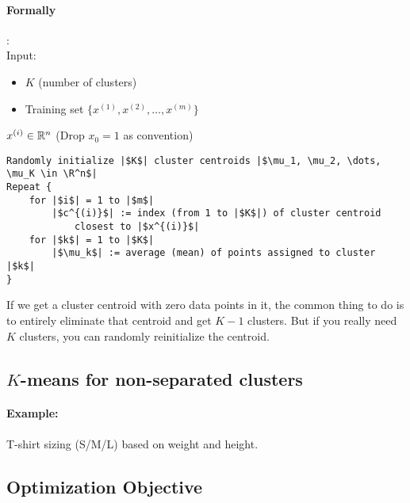 \paragraph{Formally}:\\
Input:
\begin{itemize}
	\item $K$ (number of clusters)
	\item Training set $\{x^{(1)}, x^{(2)}, \dots, x^{(m)}\}$
\end{itemize}

\begin{remark}
	$x^{(i)} \in \mathbb{R}^n$ (Drop $x_0 = 1$ as convention)
\end{remark}

\begin{verbatim}
Randomly initialize |$K$| cluster centroids |$\mu_1, \mu_2, \dots, \mu_K \in \R^n$|
Repeat {
	for |$i$| = 1 to |$m$|
		|$c^{(i)}$| := index (from 1 to |$K$|) of cluster centroid
			closest to |$x^{(i)}$|
	for |$k$| = 1 to |$K$|
		|$\mu_k$| := average (mean) of points assigned to cluster |$k$|
}
\end{verbatim}

\begin{remark}
	If we get a cluster centroid with zero data points in it, the common thing to do is to
	entirely eliminate that centroid and get $K-1$ clusters. But if you really need $K$
	clusters, you can randomly reinitialize the centroid.
\end{remark}

\subsection{\texorpdfstring{$K$-means for non-separated clusters}{}}
\paragraph{Example:} T-shirt sizing (S/M/L) based on weight and height.

\subsection{Optimization Objective}
